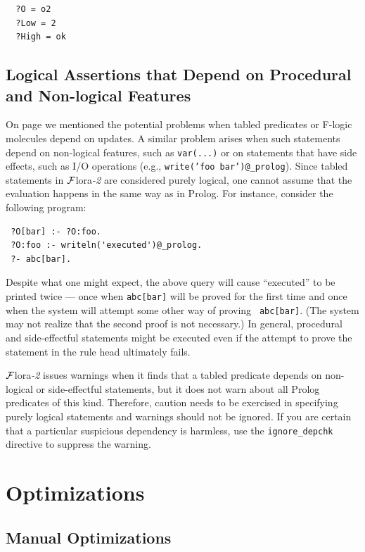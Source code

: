 \documentclass[11pt]{article}
\newcommand{\FLORA}{{\mbox{\sc ${\cal F}${lora}\rm\emph{-2}}}\xspace}
\begin{document}
\begin{itemize}
\begin{verbatim}
  ?O = o2
  ?Low = 2
  ?High = ok
\end{verbatim}

\end{itemize}



\subsection{Logical Assertions that Depend on Procedural and Non-logical Features}

On page \pageref{page-depchk} we mentioned the potential problems when
tabled predicates or F-logic molecules depend on updates. A similar problem
arises when such statements depend on non-logical features, such as
{\tt var(...)} or on statements that have side effects, such as I/O
operations (e.g., {\tt write('foo bar')@\_prolog}). Since tabled statements
in \FLORA are considered purely logical, one cannot assume that the
evaluation happens in the same way as in Prolog.
For instance, consider the following program:
\begin{verbatim}
 ?O[bar] :- ?O:foo.
 ?O:foo :- writeln('executed')@_prolog.  
 ?- abc[bar].
\end{verbatim}
Despite what one might expect, the above query will cause ``executed'' to
be printed twice --- once when {\tt abc[bar]} will be proved for the first
time and once when the system will attempt some other way of proving {\tt
  abc[bar]}. (The system may not realize that the second proof is not
necessary.) In general, procedural and side-effectful statements 
might be executed even if the attempt to prove the statement in the rule
head ultimately fails.

\FLORA issues warnings when it finds that a tabled predicate depends on
non-logical or side-effectful statements, but it does not warn about all
Prolog predicates of this kind. Therefore, caution needs to be exercised in
specifying purely logical statements and warnings should not be ignored.
If you are certain that a particular suspicious dependency
is harmless, use the {\tt ignore\_depchk} directive to suppress the warning.


\section{Optimizations}

\subsection{Manual Optimizations}
\end{document}

